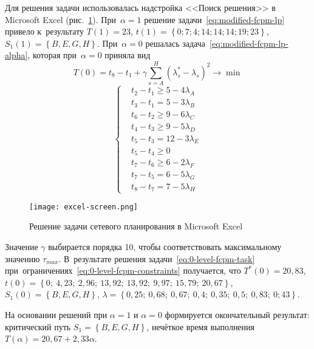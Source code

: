 Для решения задачи использовалась надстройка <<Поиск решения>> в Microsoft Excel (рис.~\ref{fig:excel-screen}). При~$\alpha=1$ решение задачи~\eqref{eq:modified-fcpm-lp} привело к~результату $T\left( 1 \right)=23$, $t\left( 1 \right)=\left\{ 0;7;4;14;14;14;19;23 \right\}$, $S_1\left( 1 \right)=\left\{ B,E,G,H \right\}$. При~$\alpha=0$ решалась задача~\eqref{eq:modified-fcpm-lp-alpha}, которая при~$\alpha=0$ приняла вид
\begin{equation}
\label{eq:0-level-fcpm-task}
  T\left( 0 \right)=t_8-t_1+\gamma \sum\limits_{s=A}^{H}\left( \lambda_{s}^{*}-\lambda_s \right)^{2}\to \min
\end{equation}
\begin{equation}
\label{eq:0-level-fcpm-constraints}
  \left\{ \begin{aligned}
    & t_2-t_1 \geqslant 5-4\lambda_A \\ 
    & t_3-t_1=5-3\lambda_B \\ 
    & t_6-t_2 \geqslant 9-6\lambda_C \\ 
    & t_4-t_3 \geqslant 9-5\lambda_D \\ 
    & t_5-t_3=12-3\lambda_E \\ 
    & t_5-t_4 \geqslant 0 \\ 
    & t_7-t_6 \geqslant 6-2\lambda_F \\ 
    & t_7-t_5=6-5\lambda_G \\ 
    & t_8-t_7=7-5\lambda_H
  \end{aligned} \right.
\end{equation}

\begin{figure}[h!] 
  \center
  \texttt{[image: excel-screen.png]}
  \caption{Решение задачи сетевого планирования в Microsoft Excel} 
  \label{fig:excel-screen}
\end{figure}

Значение $\gamma$ выбирается порядка 10, чтобы соответствовать максимальному значению $\tau_{max}$. В~результате решения задачи~\eqref{eq:0-level-fcpm-task} при~ограничениях~\eqref{eq:0-level-fcpm-constraints} получается, что $T^*\left( 0 \right)=20,83$, $t\left(0\right)=\left\{ 0;\ 4,23;\ 2,96;\ 13,92;\ 13,92;\ 9,97;\ 15,79;\ 20,67 \right\}$, $S_1\left( 0 \right)=\left\{ B,E,G,H \right\}$, $\lambda =\left\{ 0,25;\ 0,68;\ 0,67;\ 0,4;\ 0,35;\ 0,5;\ 0,83;\ 0;43 \right\}$.

На основании решений при $\alpha=1$ и $\alpha=0$ формируется окончательный результат: критический путь $S_1=\left\{ B,E,G,H \right\}$, нечёткое время выполнения $T\left( \alpha \right)=20,67+2,33\alpha$.

